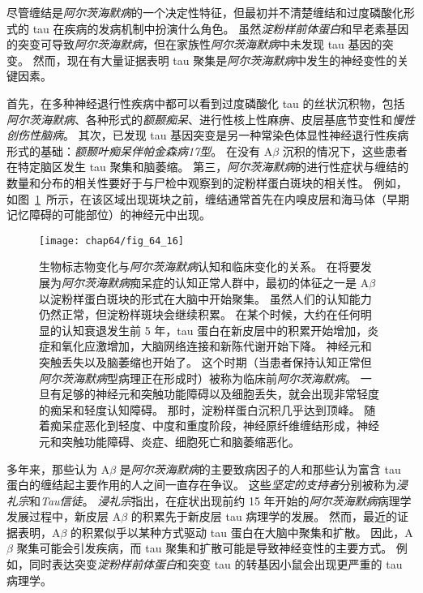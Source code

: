 尽管缠结是\textit{阿尔茨海默病}的一个决定性特征，但最初并不清楚缠结和过度磷酸化形式的 tau 在疾病的发病机制中扮演什么角色。
虽然\textit{淀粉样前体蛋白}和早老素基因的突变可导致\textit{阿尔茨海默病}，但在家族性\textit{阿尔茨海默病}中未发现 tau 基因的突变。
然而，现在有大量证据表明 tau 聚集是\textit{阿尔茨海默病}中发生的神经变性的关键因素。


首先，在多种神经退行性疾病中都可以看到过度磷酸化 tau 的丝状沉积物，包括\textit{阿尔茨海默病}、各种形式的\textit{额颞痴呆}、进行性核上性麻痹、皮层基底节变性和\textit{慢性创伤性脑病}。
其次，已发现 tau 基因突变是另一种常染色体显性神经退行性疾病形式的基础：\textit{额颞叶痴呆伴帕金森病17型}。
在没有 A$\beta$ 沉积的情况下，这些患者在特定脑区发生 tau 聚集和脑萎缩。
第三，\textit{阿尔茨海默病}的进行性症状与缠结的数量和分布的相关性要好于与尸检中观察到的淀粉样蛋白斑块的相关性。
例如，如图~\ref{fig:64_16}~所示，在该区域出现斑块之前，缠结通常首先在内嗅皮层和海马体（早期记忆障碍的可能部位）的神经元中出现。


\begin{figure}[htbp]
	\centering
	\texttt{[image: chap64/fig\_64\_16]}
	\caption{生物标志物变化与\textit{阿尔茨海默病}认知和临床变化的关系。
		在将要发展为\textit{阿尔茨海默病}痴呆症的认知正常人群中，最初的体征之一是 A$\beta$ 以淀粉样蛋白斑块的形式在大脑中开始聚集。
		虽然人们的认知能力仍然正常，但淀粉样斑块会继续积累。
		在某个时候，大约在任何明显的认知衰退发生前 5 年，tau 蛋白在新皮层中的积累开始增加，炎症和氧化应激增加，大脑网络连接和新陈代谢开始下降。
		神经元和突触丢失以及脑萎缩也开始了。
		这个时期（当患者保持认知正常但\textit{阿尔茨海默病}型病理正在形成时）被称为临床前\textit{阿尔茨海默病}。
		一旦有足够的神经元和突触功能障碍以及细胞丢失，就会出现非常轻度的痴呆和轻度认知障碍。
		那时，淀粉样蛋白沉积几乎达到顶峰。
		随着痴呆症恶化到轻度、中度和重度阶段，神经原纤维缠结形成，神经元和突触功能障碍、炎症、细胞死亡和脑萎缩恶化\cite{perrin2009multimodal}。}
	\label{fig:64_16}
\end{figure}


多年来，那些认为 A$\beta$ 是\textit{阿尔茨海默病}的主要致病因子的人和那些认为富含 tau 蛋白的缠结起主要作用的人之间一直存在争议。
这些\textit{坚定的支持者}分别被称为\textit{浸礼宗}和\textit{Tau信徒}。
\textit{浸礼宗}指出，在症状出现前约 15 年开始的\textit{阿尔茨海默病}病理学发展过程中，新皮层 A$\beta$ 的积累先于新皮层 tau 病理学的发展。
然而，最近的证据表明，A$\beta$ 的积累似乎以某种方式驱动 tau 蛋白在大脑中聚集和扩散。
因此，A$\beta$ 聚集可能会引发疾病，而 tau 聚集和扩散可能是导致神经变性的主要方式。
例如，同时表达突变\textit{淀粉样前体蛋白}和突变 tau 的转基因小鼠会出现更严重的 tau 病理学。


